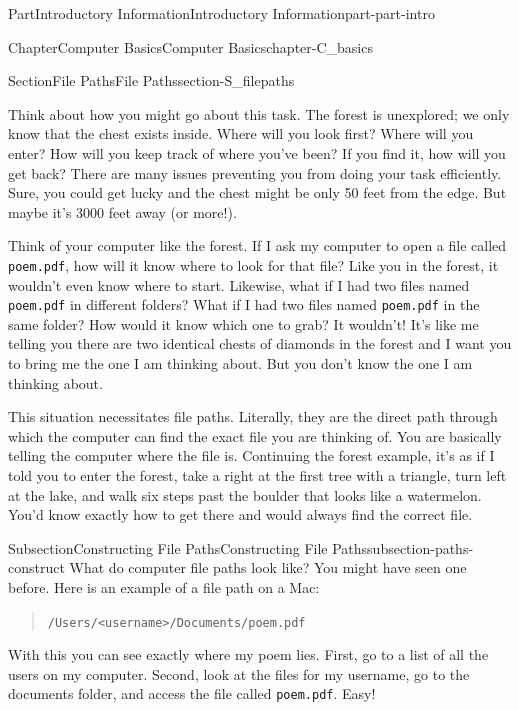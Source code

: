 \documentclass[oneside,10pt,]{book}
\newcommand{\mono}[1]{\texttt{#1}}
\begin{document}
\begin{partptx}{Part}{Introductory Information}{}{Introductory Information}{}{}{part-part-intro}
\begin{chapterptx}{Chapter}{Computer Basics}{}{Computer Basics}{}{}{chapter-C_basics}
\begin{sectionptx}{Section}{File Paths}{}{File Paths}{}{}{section-S_filepaths}
\begin{introduction}{}
\par
Think about how you might go about this task. The forest is unexplored; we only know that the chest exists inside. Where will you look first? Where will you enter? How will you keep track of where you've been? If you find it, how will you get back? There are many issues preventing you from doing your task efficiently. Sure, you could get lucky and the chest might be only 50 feet from the edge. But maybe it's 3000 feet away (or more!).%
\par
Think of your computer like the forest. If I ask my computer to open a file called \mono{poem.pdf}, how will it know where to look for that file? Like you in the forest, it wouldn't even know where to start. Likewise, what if I had two files named \mono{poem.pdf} in different folders? What if I had two files named \mono{poem.pdf} in the same folder? How would it know which one to grab? It wouldn't! It's like me telling you there are two identical chests of diamonds in the forest and I want you to bring me the one I am thinking about. But you don't know the one I am thinking about.%
\par
This situation necessitates file paths. Literally, they are the direct path through which the computer can find the exact file you are thinking of. You are basically telling the computer where the file is. Continuing the forest example, it's as if I told you to enter the forest, take a right at the first tree with a triangle, turn left at the lake, and walk six steps past the boulder that looks like a watermelon. You'd know exactly how to get there and would always find the correct file.%
\end{introduction}%
%
%
\typeout{************************************************}
\typeout{************************************************}
%
\begin{subsectionptx}{Subsection}{Constructing File Paths}{}{Constructing File Paths}{}{}{subsection-paths-construct}
%
%
%
What do computer file paths look like? You might have seen one before. Here is an example of a file path on a Mac:%
\begin{quote}%
\mono{/Users/<username>/Documents/poem.pdf}%
\end{quote}
With this you can see exactly where my poem lies. First, go to a list of all the users on my computer. Second, look at the files for my username, go to the documents folder, and access the file called \mono{poem.pdf}. Easy!%

\end{subsectionptx}
\end{sectionptx}
\end{chapterptx}
\end{partptx}
\end{document}
